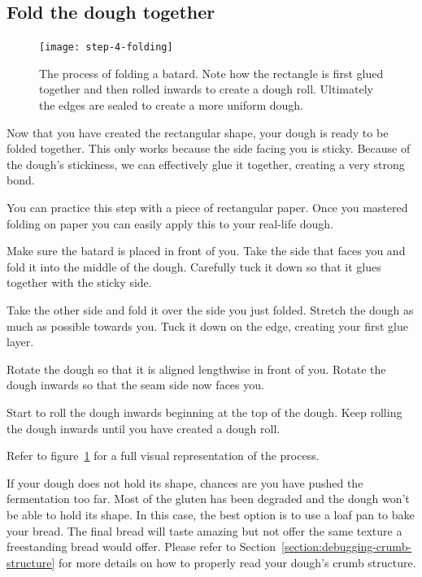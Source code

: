 \subsection[Folding]{Fold the dough together}

\begin{figure}[htb!]
  \texttt{[image: step-4-folding]}
  \caption[Step 4 of shaping process]{The process of folding a batard. Note
      how the rectangle is first glued together and then rolled inwards to
      create a dough roll. Ultimately the edges are sealed to create a more
      uniform dough.}%
  \label{fig:shaping-folding}
\end{figure}

Now that you have created the rectangular shape, your dough
is ready to be folded together. This only works because the side
facing you is sticky. Because of the dough's stickiness,
we can effectively glue it together, creating a very
strong bond.

You can practice this step with a piece of rectangular paper.
Once you mastered folding on paper you can easily apply
this to your real-life dough.

Make sure the batard is placed in front of you. Take the side
that faces you and fold it into the middle of the dough. Carefully
tuck it down so that it glues together with the sticky side.

Take the other side and fold it over the side you just folded.
Stretch the dough as much as possible towards you. Tuck it down
on the edge, creating your first glue layer.

Rotate the dough so that it is aligned lengthwise in front of you.
Rotate the dough inwards so that the seam side
now faces you.

Start to roll the dough inwards beginning at the top of the dough.
Keep rolling the dough inwards until you have created a dough roll.

Refer to figure~\ref{fig:shaping-folding} for a full visual
representation of the process.

If your dough does not hold its shape, chances are you have pushed
the fermentation too far. Most of the gluten has been degraded
and the dough won't be able to hold its shape. In this case,
the best option is to use a loaf pan to bake your bread. The
final bread will taste amazing but not offer the same texture
a freestanding bread would offer. Please refer to
Section~\ref{section:debugging-crumb-structure} for more
details on how to properly read your dough's crumb structure.

